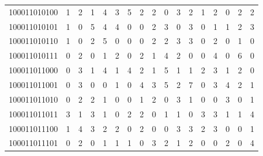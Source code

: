 \documentclass[10pt,a4paper]{article}
\begin{document}
\begin{longtable}{ |c|c|c|c|c|c|c|c|c|c|c|c|c|c|c|c|c| }
    100011010100              & 1                            & 2                                & 1                            & 4                              & 3   & 5   & 2   & 2   & 0   & 3   & 2   & 1   & 2   & 0   & 2   & 2   \\
    100011010101              & 1                            & 0                                & 5                            & 4                              & 4   & 0   & 0   & 2   & 3   & 0   & 3   & 0   & 1   & 1   & 2   & 3   \\
    100011010110              & 1                            & 0                                & 2                            & 5                              & 0   & 0   & 0   & 2   & 2   & 3   & 3   & 0   & 2   & 0   & 1   & 0   \\
    100011010111              & 0                            & 2                                & 0                            & 1                              & 2   & 0   & 2   & 1   & 4   & 2   & 0   & 0   & 4   & 0   & 6   & 0   \\
    100011011000              & 0                            & 3                                & 1                            & 4                              & 1   & 4   & 2   & 1   & 5   & 1   & 1   & 2   & 3   & 1   & 2   & 0   \\
    100011011001              & 0                            & 3                                & 0                            & 0                              & 1   & 0   & 4   & 3   & 5   & 2   & 7   & 0   & 3   & 4   & 2   & 1   \\
    100011011010              & 0                            & 2                                & 2                            & 1                              & 0   & 0   & 1   & 2   & 0   & 3   & 1   & 0   & 0   & 3   & 0   & 1   \\
    100011011011              & 3                            & 1                                & 3                            & 1                              & 0   & 2   & 2   & 0   & 1   & 1   & 0   & 3   & 3   & 1   & 1   & 4   \\
    100011011100              & 1                            & 4                                & 3                            & 2                              & 2   & 0   & 2   & 0   & 0   & 3   & 3   & 2   & 3   & 0   & 0   & 1   \\
    100011011101              & 0                            & 2                                & 0                            & 1                              & 1   & 1   & 0   & 3   & 2   & 1   & 2   & 0   & 0   & 2   & 0   & 4   \\

\end{longtable}
\end{document}
